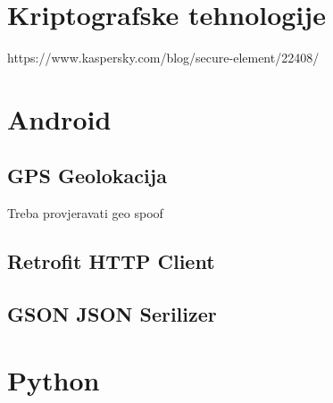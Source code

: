 \section{Kriptografske tehnologije}
https://www.kaspersky.com/blog/secure-element/22408/
\section{Android}
\subsection{GPS Geolokacija}
Treba provjeravati geo spoof
\subsection{Retrofit HTTP Client}
\subsection{GSON JSON Serilizer}
\section{Python}